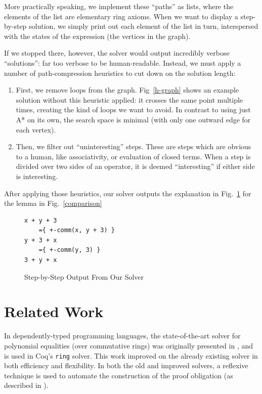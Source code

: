 \documentclass[acmsmall,review,anonymous]{acmart}\settopmatter{printfolios=true,printccs=false,printacmref=false}
\theoremstyle{remark}
\begin{document}
More practically speaking, we implement these ``paths'' as lists, where the
elements of the list are elementary ring axioms. When we want to display a
step-by-step solution, we simply print out each element of the list in turn,
interspersed with the states of the expression (the vertices in the graph).

If we stopped there, however, the solver would output incredibly verbose
``solutions'': far too verbose to be human-readable. Instead, we must apply a
number of path-compression heuristics to cut down on the solution length:

\begin{enumerate}
  \item First, we remove loops from the graph. Fig~\ref{h-graph} shows an
    example solution without this heuristic applied: it crosses the same point
    multiple times, creating the kind of loops we want to avoid. In contrast to
    using just A* on its own, the search space is minimal (with only one outward
    edge for each vertex).
  \item Then, we filter out ``uninteresting'' steps. These are steps which are
    obvious to a human, like associativity, or evaluation of closed terms. When
    a step is divided over two sides of an operator, it is deemed
    ``interesting'' if either side is interesting.
\end{enumerate}
After applying those heuristics, our solver outputs the explanation in
Fig.~\ref{step-output} for the lemma in Fig.~\ref{comparison}
\begin{figure}[h!]
  \vspace{-10pt}
\begin{BVerbatim}
x + y + 3
    ={ +-comm(x, y + 3) }
y + 3 + x
    ={ +-comm(y, 3) }
3 + y + x
\end{BVerbatim}
  \caption{Step-by-Step Output From Our Solver}
  \label{step-output}
  \vspace{-20pt}
\end{figure}
\section{Related Work}
In dependently-typed programming languages, the state-of-the-art solver for
polynomial equalities (over commutative rings) was originally presented
in \citet{gregoire_proving_2005}, and is used in Coq's \verb+ring+ solver. This
work improved on the already existing solver \cite{Coq:manual} in both efficiency
and flexibility. In both the old and improved solvers, a reflexive technique is
used to automate the construction of the proof obligation (as described in
\citet{boutin_using_1997}).
\end{document}
